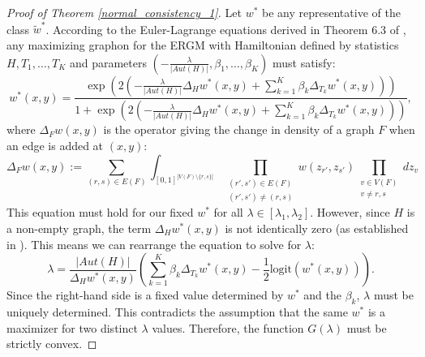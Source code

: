 \documentclass[12pt]{article}
\numberwithin{equation}{section}
\begin{document}
\begin{proof}[Proof of Theorem \ref{normal_consistency_1}]
Let $w^*$ be any representative of the class $\tilde{w}^*$. According to the Euler-Lagrange equations derived in Theorem 6.3 of \cite{chatterjee2013estimating}, any maximizing graphon for the ERGM with Hamiltonian defined by statistics $H, T_1, \dots, T_K$ and parameters $(-\frac{\lambda}{|Aut(H)|}, \beta_1, \dots, \beta_K)$ must satisfy:
\[
w^*(x,y) = \frac{\exp\left(2 \left(-\frac{\lambda}{|Aut(H)|}\Delta_H w^*(x,y) + \sum_{k=1}^K \beta_k \Delta_{T_k} w^*(x,y)\right)\right)}{1 + \exp\left(2 \left(-\frac{\lambda}{|Aut(H)|}\Delta_H w^*(x,y) + \sum_{k=1}^K \beta_k \Delta_{T_k} w^*(x,y)\right)\right)},
\]
where $\Delta_F w(x,y)$ is the operator giving the change in density of a graph $F$ when an edge is added at $(x,y)$:
$$
\Delta_F w(x,y) := \sum_{(r,s)\in E(F)} \int_{[0,1]^{|V(F)\setminus\{r,s\}|}} \prod_{\substack{(r',s')\in E(F) \\ (r',s')\neq(r,s)}} w(z_{r'}, z_{s'}) \prod_{\substack{v\in V(F) \\ v \neq r,s}} dz_v
$$
This equation must hold for our fixed $w^*$ for all $\lambda \in [\lambda_1, \lambda_2]$. However, since $H$ is a non-empty graph, the term $\Delta_H w^*(x,y)$ is not identically zero (as established in \cite{chatterjee2013estimating}). This means we can rearrange the equation to solve for $\lambda$:
\[
\lambda = \frac{|Aut(H)|}{\Delta_H w^*(x,y)} \left( \sum_{k=1}^K \beta_k \Delta_{T_k} w^*(x,y) - \frac{1}{2}\text{logit}(w^*(x,y)) \right).
\]
Since the right-hand side is a fixed value determined by $w^*$ and the $\beta_k$, $\lambda$ must be uniquely determined. This contradicts the assumption that the same $w^*$ is a maximizer for two distinct $\lambda$ values. Therefore, the function $G(\lambda)$ must be strictly convex.


\end{proof}
\end{document}
